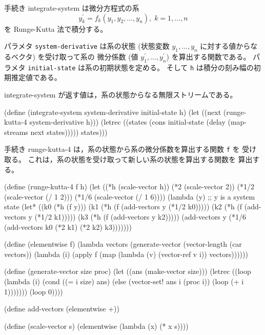 

\nobreak
手続き {\cf integrate-system} は微分方程式の系
$$y_k^\prime = f_k(y_1, y_2, \ldots, y_n), \; k = 1, \ldots, n$$
を Runge-Kutta 法で積分する。

パラメタ {\tt system-derivative} は系の状態 (状態変数 $y_1, \ldots, 
y_n$ に対する値からなるベクタ) を受け取って系の
微分係数 (値 $y_1^\prime, \ldots, y_n^\prime$) を算出する関数である。
パラメタ {\tt initial-state} は系の初期状態を定める。
そして {\tt h} は積分の刻み幅の初期推定値である。

{\cf integrate-system} が返す値は，系の状態からなる無限ストリームである。

\begin{schemenoindent}
(define (integrate-system system-derivative
                          initial-state
                          h)
  (let ((next (runge-kutta-4 system-derivative h)))
    (letrec ((states
              (cons initial-state
                    (delay (map-streams next
                                        states)))))
      states)))%
\end{schemenoindent}

手続き {\cf runge-kutta-4} は，系の状態から系の微分係数を算出する関数 {\tt f} を
受け取る。
これは，系の状態を受け取って新しい系の状態を算出する関数を
算出する。

\begin{schemenoindent}
(define (runge-kutta-4 f h)
  (let ((*h (scale-vector h))
        (*2 (scale-vector 2))
        (*1/2 (scale-vector (/ 1 2)))
        (*1/6 (scale-vector (/ 1 6))))
    (lambda (y)
      ;; y is a system state
      (let* ((k0 (*h (f y)))
             (k1 (*h (f (add-vectors y (*1/2 k0)))))
             (k2 (*h (f (add-vectors y (*1/2 k1)))))
             (k3 (*h (f (add-vectors y k2)))))
        (add-vectors y
          (*1/6 (add-vectors k0
                             (*2 k1)
                             (*2 k2)
                             k3)))))))

(define (elementwise f)
  (lambda vectors
    (generate-vector
     (vector-length (car vectors))
     (lambda (i)
       (apply f
              (map (lambda (v) (vector-ref  v i))
                   vectors))))))

(define (generate-vector size proc)
  (let ((ans (make-vector size)))
    (letrec ((loop
              (lambda (i)
                (cond ((= i size) ans)
                      (else
                       (vector-set! ans i (proc i))
                       (loop (+ i 1)))))))
      (loop 0))))

(define add-vectors (elementwise +))

(define (scale-vector s)
  (elementwise (lambda (x) (* x s))))%
\end{schemenoindent}


